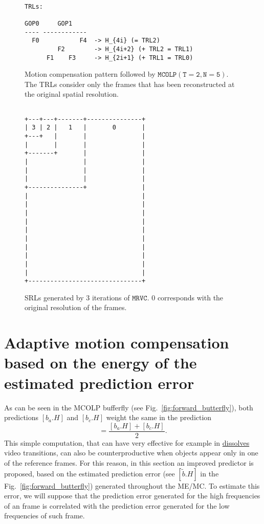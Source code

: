 \begin{figure}
\begin{verbatim}

TRLs:

GOP0     GOP1
---- ------------
  F0           F4  -> H_{4i} (= TRL2)
         F2        -> H_{4i+2} (+ TRL2 = TRL1)
      F1    F3     -> H_{2i+1} (+ TRL1 = TRL0)
\end{verbatim}
  \caption{Motion compensation pattern followed by $\mathtt{MCOLP(T=2,
      N=5)}$. The TRLs consider only the frames that has been
    reconstructed at the original spatial resolution.}
  \label{fig:MRVC_2_5_T}
\end{figure}

\begin{figure}
\begin{verbatim}

+---+---+-------+---------------+
| 3 | 2 |   1   |       0       |
+---+   |       |               |
|       |       |               |
+-------+       |               |
|               |               |
|               |               |
|               |               |
+---------------+               |
|                               |
|                               |
|                               |
|                               |
|                               |
|                               |
|                               |
|                               |
|                               |
|                               |
+-------------------------------+
\end{verbatim}
\caption{SRLs generated by $3$ iterations of $\mathtt{MRVC}$. $0$
    corresponds with the original resolution of the frames.}
  \label{fig:MRVC_2_5_S}
\end{figure}


\section{Adaptive motion compensation based on the energy of the estimated prediction error}

As can be seen in the MCOLP bufferfly (see
Fig.~\ref{fig:forward_butterfly}), both predictions $[b_a.H]$ and
$[b_c.H]$ weight the same in the prediction
\begin{equation}
  [\hat{b.H}] = \frac{[b_a.H] + [b_c.H]}{2}.
\end{equation}
This simple computation, that can have very effective for example in
\href{https://biteable.com/blog/tips/video-transitions-effects-examples/}{dissolves}
video transitions, can also be counterproductive when objects appear
only in one of the reference frames. For this reason, in this section
an improved predictor is proposed, based on the estimated prediction
error (see $[\tilde{b}.H]$ in the Fig.~\ref{fig:forward_butterfly})
generated throughout the ME/MC. To estimate this error, we will
suppose that the prediction error generated for the high frequencies
of an frame is correlated with the prediction error generated for the
low frequencies of such frame.

